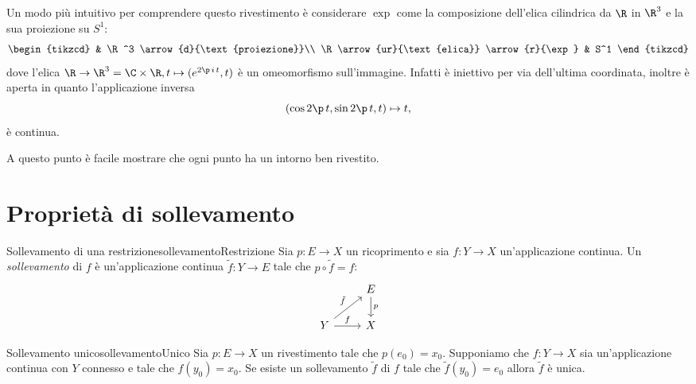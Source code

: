 \begin{oss}
	Un modo più intuitivo per comprendere questo rivestimento è considerare \(\exp\) come la composizione dell'elica cilindrica da \(\R\) in \(\R^3\) e la sua proiezione su \(S^1\):
	\[
		\begin{tikzcd}
			& \R^3 \arrow{d}{\text{proiezione}}\\
			\R \arrow{ur}{\text{elica}} \arrow{r}{\exp} & S^1
		\end{tikzcd}
	\]
	dove l'elica \(\R\to \R^3 = \C \times \R, t \mapsto (e^{2\p\,i\,t},t)\) è un omeomorfismo sull'immagine.
	Infatti è iniettivo per via dell'ultima coordinata, inoltre è aperta in quanto l'applicazione inversa
	\[
		(\cos 2\p\,t, \sin 2\p\,t, t) \mapsto t,
	\]
	è continua.

	A questo punto è facile mostrare che ogni punto ha un intorno ben rivestito.
\end{oss}
\section{Proprietà di sollevamento}

\begin{defn}{Sollevamento di una restrizione}{sollevamentoRestrizione}
	Sia \(p\colon E \to X\) un ricoprimento e sia \(f\colon Y \to X\) un'applicazione continua.
	Un \emph{sollevamento} di \(f\) è un'applicazione continua \(\tilde{f}\colon Y \to E\) tale che \(p\circ \tilde{f}=f\):
	\[
		\begin{tikzcd}
			& E \arrow{d}{p}\\
			Y \arrow{ur}{\tilde{f}} \arrow{r}{f} & X
		\end{tikzcd}
	\]
\end{defn}

\begin{teor}{Sollevamento unico}{sollevamentoUnico}
	Sia \(p\colon E \to X\) un rivestimento tale che \(p(e_0)=x_0\).
	Supponiamo che \(f\colon Y \to X\) sia un'applicazione continua con \(Y\) connesso e tale che \(f(y_0)=x_0\).
	Se esiste un sollevamento \(\tilde{f}\) di \(f\) tale che \(\tilde{f}(y_0)=e_0\) allora \(\tilde{f}\) è unica.
\end{teor}


